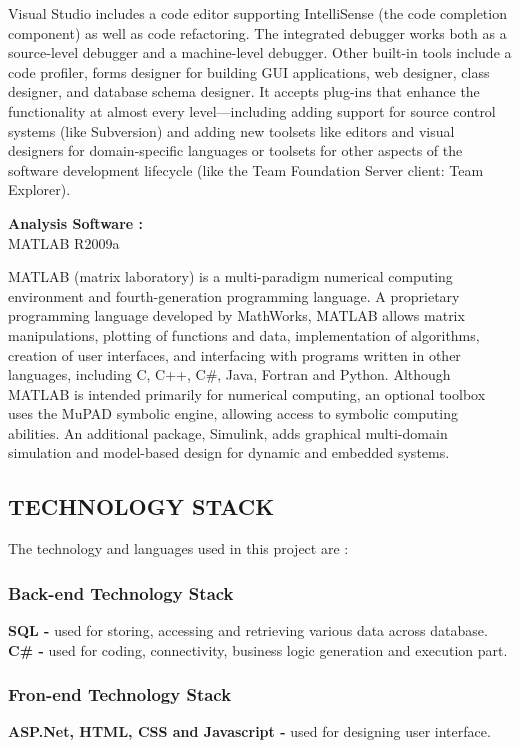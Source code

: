 \documentclass[14pt]{article} %
\begin{document}
Visual Studio includes a code editor supporting IntelliSense (the code completion component) as well as code refactoring. The integrated debugger works both as a source-level debugger and a machine-level debugger. Other built-in tools include a code profiler, forms designer for building GUI applications, web designer, class designer, and database schema designer. It accepts plug-ins that enhance the functionality at almost every level—including adding support for source control systems (like Subversion) and adding new toolsets like editors and visual designers for domain-specific languages or toolsets for other aspects of the software development lifecycle (like the Team Foundation Server client: Team Explorer).\\  \par
\textbf{Analysis Software :}\\
\indent MATLAB R2009a\\ \par
MATLAB (matrix laboratory) is a multi-paradigm numerical computing environment and fourth-generation programming language. A proprietary programming language developed by MathWorks, MATLAB allows matrix manipulations, plotting of functions and data, implementation of algorithms, creation of user interfaces, and interfacing with programs written in other languages, including C, C++, C\#, Java, Fortran and Python.
Although MATLAB is intended primarily for numerical computing, an optional toolbox uses the MuPAD symbolic engine, allowing access to symbolic computing abilities. An additional package, Simulink, adds graphical multi-domain simulation and model-based design for dynamic and embedded systems.

 
 \subsection{TECHNOLOGY STACK}
\noindent The technology and languages used in this project are :
\subsubsection{Back-end Technology Stack}
\indent \textbf{SQL - } used for storing, accessing and retrieving various data across database.\\
\indent \textbf{C\# - } used for coding, connectivity, business logic generation and execution part.
\subsubsection{Fron-end Technology Stack}
\indent \textbf{ASP.Net, HTML, CSS and Javascript - } used for designing user interface. 
\end{document}
